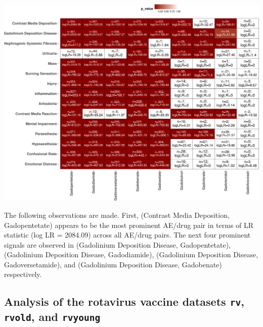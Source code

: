 \begin{center}\includegraphics[width=1\linewidth]{pvlrt-package-paper-Rjournal_files/figure-latex/heatmap-zip-gbca-latex-1} \end{center}

The following observations are made. First, (Contrast Media Deposition, Gadopentetate) appears to be the most prominent AE/drug pair in terms of LR statistic (log LR = 2084.09) across all AE/drug pairs. The next four prominent signals are observed in (Gadolinium Deposition Disease, Gadopentetate), (Gadolinium Deposition Disease, Gadodiamide), (Gadolinium Deposition Disease, Gadoversetamide), and (Gadolinium Deposition Disease, Gadobenate) respectively.

\hypertarget{analysis-of-the-rotavirus-vaccine-datasets-rv-rvold-and-rvyoung}{%
\subsection{\texorpdfstring{Analysis of the rotavirus vaccine datasets \texttt{rv}, \texttt{rvold}, and \texttt{rvyoung}}{Analysis of the rotavirus vaccine datasets rv, rvold, and rvyoung}}\label{analysis-of-the-rotavirus-vaccine-datasets-rv-rvold-and-rvyoung}}

